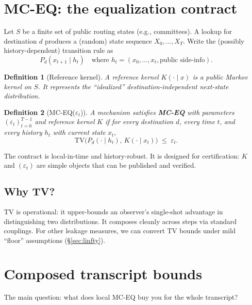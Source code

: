 \documentclass[11pt]{article}
\newtheorem{definition}{Definition}
\newcommand{\TV}{\mathrm{TV}}
\newcommand{\eps}{\varepsilon}
\begin{document}
\section{MC-EQ: the equalization contract}
Let $S$ be a finite set of public routing states (e.g., committees).
A lookup for destination $d$ produces a (random) state sequence $X_0,\dots,X_T$.
Write the (possibly history-dependent) transition rule as
\[
P_d(x_{t+1}\mid h_t) \quad\text{where } h_t=(x_0,\dots,x_t,\text{public side-info}).
\]

\begin{definition}[Reference kernel]
A \emph{reference kernel} $K(\cdot\mid x)$ is a public Markov kernel on $S$.
It represents the ``idealized'' destination-independent next-state distribution.
\end{definition}

\begin{definition}[MC-EQ($\eps_t$)]
A mechanism satisfies \textbf{MC-EQ} with parameters $(\eps_t)_{t=0}^{T-1}$ and reference kernel $K$ if for every destination $d$, every time $t$, and every history $h_t$ with current state $x_t$,
\[
\TV\big(P_d(\cdot\mid h_t),\,K(\cdot\mid x_t)\big)\;\le\; \eps_t.
\]
\end{definition}

The contract is local-in-time and history-robust.
It is designed for certification: $K$ and $(\eps_t)$ are simple objects that can be published and verified.

\subsection{Why TV?}
TV is operational: it upper-bounds an observer's single-shot advantage in distinguishing two distributions.
It composes cleanly across steps via standard couplings.
For other leakage measures, we can convert TV bounds under mild ``floor'' assumptions (\S\ref{sec:linfty}).

\section{Composed transcript bounds}
The main question: what does local MC-EQ buy you for the whole transcript?
\end{document}
